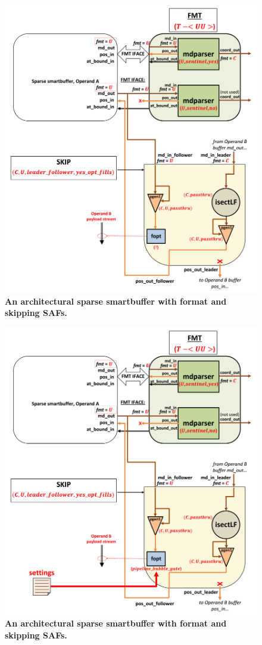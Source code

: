 \begin{figure}[ht]
\includegraphics[width=\textwidth]{figures/safinference_build_12isectlfpgenoneopt.png}
\caption{\textbf{An architectural sparse smartbuffer with format and skipping SAFs.}}
\label{fig:safinference_build_12isectlfpgenoneopt}
\centering
\end{figure}

\begin{figure}[ht]
\includegraphics[width=\textwidth]{figures/safinference_build_13foptstratcust.png}
\caption{\textbf{An architectural sparse smartbuffer with format and skipping SAFs.}}
\label{fig:safinference_build_13foptstratcust}
\centering
\end{figure}